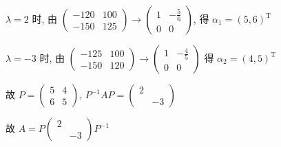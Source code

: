\begin{enumerate}
                   \( \lambda = 2 \) 时, 由 \( \begin{pmatrix}
                       -120 & 100 \\
                       -150 & 125
                   \end{pmatrix} \rightarrow \begin{pmatrix}
                       1 & -\frac{5}{6} \\
                       0 & 0
                   \end{pmatrix} \), 得 \( \alpha_{1} = (5, 6)^{\mathrm{T}} \)

                   \( \lambda = -3 \) 时, 由 \( \begin{pmatrix}
                       -125 & 100 \\
                       -150 & 120
                   \end{pmatrix} \rightarrow \begin{pmatrix}
                       1 & -\frac{4}{5} \\
                       0 & 0
                   \end{pmatrix} \) 得 \( \alpha_{2} = (4, 5)^{\mathrm{T}} \)

                   故 \( P = \begin{pmatrix}
                       5 & 4 \\
                       6 & 5
                   \end{pmatrix} \), \( P^{-1}AP = \begin{pmatrix}
                       2 &    \\
                         & -3
                   \end{pmatrix} \)

                   故 \( A = P\begin{pmatrix}
                       2 &    \\
                         & -3
                   \end{pmatrix}P^{-1} \)


\end{enumerate}
